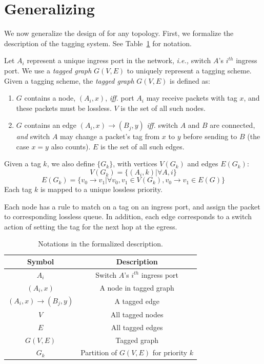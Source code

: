 \section{Generalizing \sysname{}}
\label{sec:generic}

We now generalize the design of \sysname{} for any topology. First, we 
formalize the description of the tagging system. See Table~\ref{tab:symbols} for
notation.

Let $A_i$ represent a unique ingress port in the network, {\em i.e.,} switch
$A$'s $i^{th}$ ingress port.  We use a {\em tagged graph} $G(V,E)$ to uniquely
represent a tagging scheme.  Given a tagging scheme, the {\em tagged graph}
$G(V,E)$ is defined as: 

\begin{enumerate}
\item $G$ contains a node, $(A_i, x)$, {\em iff.} port $A_i$ may receive packets with tag $x$, and these packets must 
be lossless. $V$ is the set of all such nodes.

\item $G$ contains an edge $(A_i, x)\rightarrow(B_j, y)$ {\em iff.} switch $A$ and $B$ are 
connected, {\em and} switch $A$ may change a packet's tag from $x$ to $y$ before sending to $B$ (the case $x=y$ also counts).
$E$ is the set of all such edges.

\end{enumerate}

Given a tag $k$, we also define $\{G_k\}$, with vertices $V(G_k)$ and edges
$E(G_k)$: 
$$V(G_k) = \{(A_i, k) | \forall A, i\} $$
$$E(G_k) = \{v_0 \rightarrow v_1 | \forall v_0, v_1 \in V(G_k),  v_0 \rightarrow v_1 \in E(G)\} $$
Each tag $k$ is mapped to a unique lossless priority.  

Each node has a rule to match on a tag on an ingress port, and assign the packet
to corresponding lossless queue.  In addition, each edge corresponds to a switch
action of setting the tag for the next hop at the egress.

\begin{table}[t]
\small
\centering
\begin{tabular}{|c|c|}
\hline
Symbol & Description \\ \hline
$A_i$ & Switch $A$'s $i^{th}$ ingress port  \\ \hline
$(A_i, x)$ & A node in tagged graph \\ \hline
$(A_i, x)\rightarrow(B_j, y)$ & A tagged edge \\ \hline
$V$ & All tagged nodes  \\ \hline
$E$ & All tagged edges \\ \hline
$G(V, E)$ & Tagged graph \\ \hline
$G_k$ & Partition of $G(V,E)$ for priority $k$ \\ \hline
\end{tabular}
\caption{Notations in the formalized description.}
\label{tab:symbols}
		\vspace{-1em}
\end{table}

